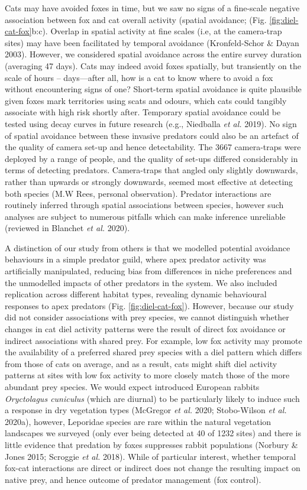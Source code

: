 \documentclass[11pt,a4paper,titlepage,twoside,openright]{style/unimelbthesis}
\begin{document}
\begin{mainmatter}
Cats may have avoided foxes in time, but we saw no signs of a fine-scale negative association between fox and cat overall activity (spatial avoidance; (Fig. \ref{fig:diel-cat-fox}b:c). Overlap in spatial activity at fine scales (i.e, at the camera-trap sites) may have been facilitated by temporal avoidance (Kronfeld-Schor \& Dayan 2003). However, we considered spatial avoidance across the entire survey duration (averaging 47 days). Cats may indeed avoid foxes spatially, but transiently on the scale of hours -- days---after all, how is a cat to know where to avoid a fox without encountering signs of one? Short-term spatial avoidance is quite plausible given foxes mark territories using scats and odours, which cats could tangibly associate with high risk shortly after. Temporary spatial avoidance could be tested using decay curves in future research (e.g., Niedballa \emph{et al.} 2019). No sign of spatial avoidance between these invasive predators could also be an artefact of the quality of camera set-up and hence detectability. The 3667 camera-traps were deployed by a range of people, and the quality of set-ups differed considerably in terms of detecting predators. Camera-traps that angled only slightly downwards, rather than upwards or strongly downwards, seemed most effective at detecting both species (M.W Rees, personal observation). Predator interactions are routinely inferred through spatial associations between species, however such analyses are subject to numerous pitfalls which can make inference unreliable (reviewed in Blanchet \emph{et al.} 2020).

A distinction of our study from others is that we modelled potential avoidance behaviours in a simple predator guild, where apex predator activity was artificially manipulated, reducing bias from differences in niche preferences and the unmodelled impacts of other predators in the system. We also included replication across different habitat types, revealing dynamic behavioural responses to apex predators (Fig. \ref{fig:diel-cat-fox}). However, because our study did not consider associations with prey species, we cannot distinguish whether changes in cat diel activity patterns were the result of direct fox avoidance or indirect associations with shared prey. For example, low fox activity may promote the availability of a preferred shared prey species with a diel pattern which differs from those of cats on average, and as a result, cats might shift diel activity patterns at sites with low fox activity to more closely match those of the more abundant prey species. We would expect introduced European rabbits \emph{Oryctolagus cuniculus} (which are diurnal) to be particularly likely to induce such a response in dry vegetation types (McGregor \emph{et al.} 2020; Stobo-Wilson \emph{et al.} 2020a), however, Leporidae species are rare within the natural vegetation landscapes we surveyed (only ever being detected at 40 of 1232 sites) and there is little evidence that predation by foxes suppresses rabbit populations (Norbury \& Jones 2015; Scroggie \emph{et al.} 2018). While of particular interest, whether temporal fox-cat interactions are direct or indirect does not change the resulting impact on native prey, and hence outcome of predator management (fox control).


\end{mainmatter}
\end{document}
